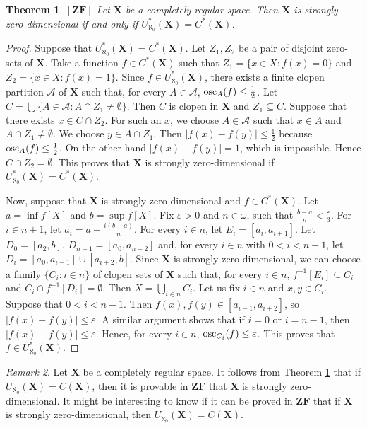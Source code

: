 \documentclass[12pt,twoside,leqno]{article}
\theoremstyle{plain}
\newtheorem{theorem}{Theorem}[section]
\theoremstyle{definition}
\theoremstyle{remark}
\newtheorem{remark}[theorem]{Remark}
\DeclareMathOperator{\osc}{{\rm osc}}
\begin{document}
\begin{theorem}
	\label{s2:t13}
	$[\mathbf{ZF}]$ Let $\mathbf{X}$ be a completely regular space. Then $\mathbf{X}$ is strongly zero-dimensional if and only if $U_{\aleph_0}^{\ast}(\mathbf{X})=C^{\ast}(\mathbf{X})$. 
\end{theorem}
\begin{proof}
	Suppose that $U_{\aleph_0}^{\ast}(\mathbf{X})=C^{\ast}(\mathbf{X})$. Let $Z_1, Z_2$ be a pair of disjoint zero-sets of $\mathbf{X}$. Take a function $f\in C^{\ast}(\mathbf{X})$ such that $Z_1=\{x\in X: f(x)=0\}$ and $Z_2=\{x\in X: f(x)=1\}$. Since $f\in U_{\aleph_0}^{\ast}(\mathbf{X})$, there exists a finite clopen partition $\mathcal{A}$ of $\mathbf{X}$ such that, for every $A\in\mathcal{A}$, $\osc_{A}(f)\leq\frac{1}{2}$. Let $C=\bigcup\{A\in\mathcal{A}: A\cap Z_1\neq\emptyset\}$. Then $C$ is clopen in $\mathbf{X}$ and $Z_1\subseteq C$. Suppose that there exists $x\in C\cap Z_2$. For such an $x$, we choose $A\in\mathcal{A}$ such that $x\in A$ and $A\cap Z_1\neq\emptyset$. We choose $y\in A\cap Z_1$. Then $|f(x)-f(y)|\leq\frac{1}{2}$ because $\osc_{A}(f)\leq\frac{1}{2}$. On the other hand $|f(x)-f(y)|=1$, which is impossible. Hence $C\cap Z_2=\emptyset$. This proves that $\mathbf{X}$ is strongly zero-dimensional if $U_{\aleph_0}^{\ast}(\mathbf{X})=C^{\ast}(\mathbf{X})$.
	
	Now, suppose that $\mathbf{X}$ is strongly zero-dimensional and $f\in C^{\ast}(\mathbf{X})$. Let $a=\inf f[X]$ and $b=\sup f[X]$. Fix $\varepsilon >0$ and $n\in\omega$, such that $\frac{b-a}{n}<\frac{\varepsilon}{3}$. For $i\in n+1$, let $a_i= a+\frac{i(b-a)}{n}$. For every $i\in n$, let $E_i=[a_i, a_{i+1}]$. Let  $D_0=[a_2, b]$, $D_{n-1}=[a_0, a_{n-2}]$ and, for every $i\in n$ with $0<i<n-1$, let $D_i=[a_0, a_{i-1}]\cup [a_{i+2}, b]$. Since $\mathbf{X}$ is strongly zero-dimensional, we can choose a family $\{C_i: i\in n\}$ of clopen sets of $\mathbf{X}$ such that, for every $i\in n$, $f^{-1}[ E_i]\subseteq C_i$ and $C_i\cap f^{-1}[ D_i]=\emptyset$. Then $X=\bigcup\limits_{i\in n}C_i$. Let us fix $i\in n$ and $x,y\in C_i$. Suppose that $0<i<n-1$. Then $f(x), f(y)\in [a_{i-1}, a_{i+2}]$, so $|f(x)-f(y)|\leq\varepsilon$. A similar argument shows that if $i=0$ or $i=n-1$, then $|f(x)-f(y)|\leq\varepsilon$. Hence, for every $i\in n$, $\osc_{C_i}(f)\leq\varepsilon$. This proves that $f\in U_{\aleph_0}^{\ast}(\mathbf{X})$.  
\end{proof}

\begin{remark}
	\label{s2:r14}
	Let $\mathbf{X}$ be a completely regular space. It follows from Theorem \ref{s2:t13} that if $U_{\aleph_0}(\mathbf{X})=C(\mathbf{X})$, then it is provable in $\mathbf{ZF}$ that $\mathbf{X}$ is strongly zero-dimensional. It might be interesting to know if it can be proved in $\mathbf{ZF}$ that if $\mathbf{X}$ is strongly zero-dimensional, then  $U_{\aleph_0}(\mathbf{X})=C(\mathbf{X})$.
\end{remark}
\end{document}
